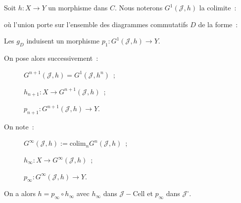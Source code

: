 \documentclass{amsart}
\theoremstyle{plain}
\theoremstyle{definition}
\theoremstyle{remark}
\newcommand{\colim}{\mathrm{colim}}
\newcommand{\ra}{\rightarrow}
\begin{document}
Soit $h:X\ra Y$ un morphisme dans $C$. Nous noterons $G^1(\mathcal{J},h)$ la colimite~:
\begin{center}
\end{center}
où l'union porte sur l'ensemble des diagrammes commutatifs $D$ de la forme~:
\begin{center}
\end{center}
Les $g_D$ induisent un morphisme $p_1:G^1(\mathcal{J},h)\ra Y$.

On pose alors successivement~:
\begin{description}
  \item[] $G^{n+1}(\mathcal{J},h)=G^1(\mathcal{J},h^n)$~;
  \item[] $h_{n+1}: X\ra G^{n+1}(\mathcal{J},h)$~;
  \item[] $p_{n+1}:G^{n+1}(\mathcal{J},h)\ra Y$.
\end{description}
On note~:
\begin{description}
  \item[] $G^{\infty}(\mathcal{J},h):=\colim_n G^n(\mathcal{J},h)$~;
  \item[] $h_\infty:X\ra G^{\infty}(\mathcal{J},h)$~;
  \item[] $p_\infty:G^{\infty}(\mathcal{J},h)\ra Y$.
\end{description}

On a alors $h=p_\infty\circ h_\infty$ avec $h_\infty$ dans $\mathcal{J}-\mathrm{Cell}$ et $p_\infty$ dans $\mathcal{J}^\square$.
\end{document}
